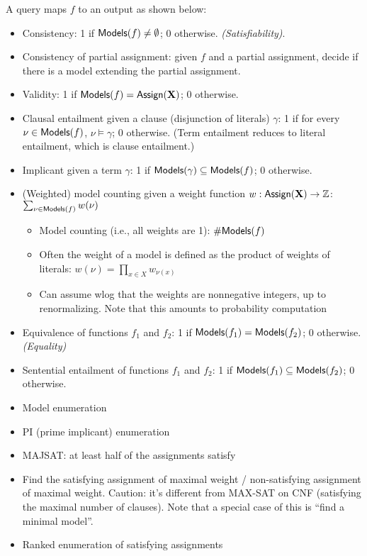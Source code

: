 A query maps $f$ to an output as shown below:
\begin{itemize}
    \item Consistency: 1 if $\mathsf{Models}(f) \neq \emptyset$; 0 otherwise. \textit{(Satisfiability)}. 
    \item Consistency of partial assignment: given $f$ and a partial assignment, decide if there is a model extending the partial assignment.
    \item Validity: 1 if $\mathsf{Models}(f) = \mathsf{Assign}(\mathbf{X})$; 0 otherwise.
    \item Clausal entailment given a clause (disjunction of literals) $\gamma$: 1 if for every $\nu\in\mathsf{Models}(f)$, $\nu\models\gamma$; 0 otherwise. (Term entailment reduces to literal entailment, which is clause entailment.)
    \item Implicant given a term $\gamma$: 1 if $\mathsf{Models}(\gamma) \subseteq \mathsf{Models}(f)$; 0 otherwise. 
    \item (Weighted) model counting given a weight function $w:\mathsf{Assign}(\mathbf{X})\to\mathbb{Z}$: $\sum_{\nu\in\mathsf{Models}(f)} w(\nu)$
    \begin{itemize}
        \item Model counting (i.e., all weights are 1): $\#\mathsf{Models}(f)$
        \item Often the weight of a model is defined as the product of weights of literals: $w(\nu)=\prod_{x\in X} w_{\nu(x)}$ 
\item Can assume wlog that the weights are nonnegative integers, up to renormalizing. Note that this amounts to probability computation
    \end{itemize}
    \item Equivalence of functions $f_1$ and $f_2$: 1 if $\mathsf{Models}(f_1)=\mathsf{Models}(f_2)$; 0 otherwise. \textit{(Equality)}
    \item Sentential entailment of functions $f_1$ and $f_2$: 1 if $\mathsf{Models}(f_1)\subseteq\mathsf{Models}(f_2)$; 0 otherwise.
    \item Model enumeration
    \item PI (prime implicant) enumeration
    \item MAJSAT: at least half of the assignments satisfy
    \item Find the satisfying assignment of maximal weight / non-satisfying assignment of maximal weight. Caution: it's different from MAX-SAT on CNF (satisfying the maximal number of clauses). Note that a special case of this is ``find a minimal model''.
    \item Ranked enumeration of satisfying assignments
\end{itemize}


